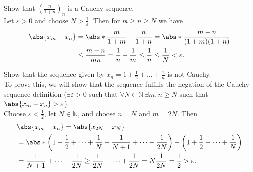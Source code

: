 \documentclass[../real_analysis.tex]{subfiles}
\begin{document}
        \begin{example}
            Show that $\left(\frac{n}{1+n}\right)_n$ is a Cauchy sequence.\\
            Let $\varepsilon>0$ and choose $N>\frac{1}{\varepsilon}$. Then for $m\geq n\geq N$ we have
            \begin{align}
                \abs{x_m-x_n}&=\abs*{\frac{m}{1+m}-\frac{n}{1+n}}=\abs*{\frac{m-n}{(1+m)(1+n)}}\\
                &\leq\frac{m-n}{mn}=\frac{1}{n}-\frac{1}{m}\leq\frac{1}{n}\leq\frac{1}{N}<\varepsilon.
            \end{align}
        \end{example}
        \begin{example}
            Show that the sequence given by $x_n=1+\frac{1}{2}+\dots+\frac{1}{n}$ is not Cauchy.\\
            To prove this, we will show that the sequence fulfills the negation of the Cauchy sequence definition ($\exists\varepsilon>0$ such that $\forall N\in\mathbb{N}\ \exists m,n\geq N$ such that $\abs{x_m-x_n}>\varepsilon$).\\
            Choose $\varepsilon<\frac{1}{2}$, let $N\in\mathbb{N}$, and choose $n=N$ and $m=2N$. Then
            \begin{align}
                &\abs{x_m-x_n}=\abs{x_{2N}-x_N}\\
                &=\abs*{\left(1+\frac{1}{2}+\dots+\frac{1}{N}+\frac{1}{N+1}+\dots+\frac{1}{2N}\right)-\left(1+\frac{1}{2}+\dots+\frac{1}{N}\right)}\\
                &=\frac{1}{N+1}+\dots+\frac{1}{2N}\geq\frac{1}{2N}+\dots+\frac{1}{2N}=N\frac{1}{2N}=\frac{1}{2}>\varepsilon.
            \end{align}
        \end{example}
\end{document}
